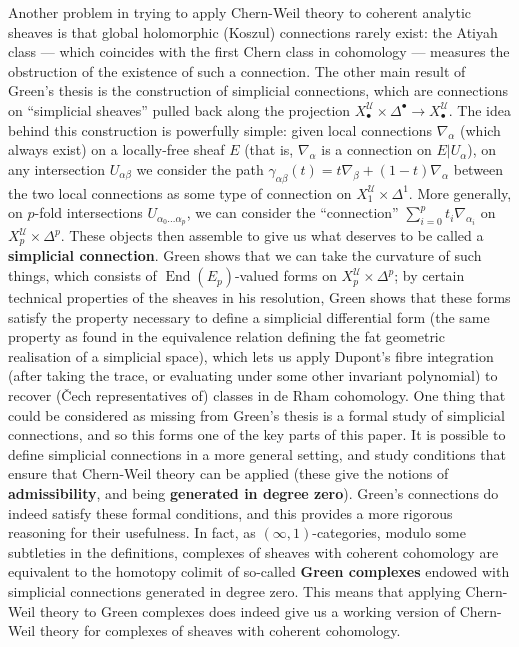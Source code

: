 \documentclass[11pt,fleqn]{article}
\theoremstyle{plain}
\theoremstyle{definition}
\theoremstyle{remark}
\numberwithin{equation}{theorem}
\newcommand{\cover}{\mathcal{U}}
\newcommand{\restricted}{\mathbin{\big\vert}}
\newcommand{\define}[1]{\textbf{#1}}
\newcommand{\nerve}[1]{X_{#1}^\cover}
\newcommand{\nervesimplex}[1]{\nerve{#1}\times\Delta^{#1}}
\DeclareMathOperator{\End}{End}
\begin{document}
    Another problem in trying to apply Chern-Weil theory to coherent analytic sheaves is that global holomorphic (Koszul) connections rarely exist: the Atiyah class --- which coincides with the first Chern class in cohomology --- measures the obstruction of the existence of such a connection.
    The other main result of Green's thesis is the construction of simplicial connections, which are connections on ``simplicial sheaves'' pulled back along the projection $\nervesimplex{\bullet}\to\nerve{\bullet}$.
    The idea behind this construction is powerfully simple: given local connections $\nabla_\alpha$ (which always exist) on a locally-free sheaf $E$ (that is, $\nabla_\alpha$ is a connection on $E\restricted U_\alpha$), on any intersection $U_{\alpha\beta}$ we consider the path $\gamma_{\alpha\beta}(t) = t\nabla_\beta + (1-t)\nabla_\alpha$ between the two local connections as some type of connection on $\nerve{1}\times\Delta^1$.
    More generally, on $p$-fold intersections $U_{\alpha_0\ldots\alpha_p}$, we can consider the ``connection'' $\sum_{i=0}^p t_i\nabla_{\alpha_i}$ on $\nerve{p}\times\Delta^p$.
    These objects then assemble to give us what deserves to be called a \define{simplicial connection}.
    Green shows that we can take the curvature of such things, which consists of $\End(E_p)$-valued forms on $\nerve{p}\times\Delta^p$; by certain technical properties of the sheaves in his resolution, Green shows that these forms satisfy the property necessary to define a simplicial differential form (the same property as found in the equivalence relation defining the fat geometric realisation of a simplicial space), which lets us apply Dupont's fibre integration (after taking the trace, or evaluating under some other invariant polynomial) to recover (Čech representatives of) classes in de Rham cohomology.
    One thing that could be considered as missing from Green's thesis is a formal study of simplicial connections, and so this forms one of the key parts of this paper.
    It is possible to define simplicial connections in a more general setting, and study conditions that ensure that Chern-Weil theory can be applied (these give the notions of \define{admissibility}, and being \define{generated in degree zero}).
    Green's connections do indeed satisfy these formal conditions, and this provides a more rigorous reasoning for their usefulness.
    In fact, as $(\infty,1)$-categories, modulo some subtleties in the definitions, complexes of sheaves with coherent cohomology are equivalent to the homotopy colimit of so-called \define{Gre{}en complexes} endowed with simplicial connections generated in degree zero.
    This means that applying Chern-Weil theory to Gre{}en complexes does indeed give us a working version of Chern-Weil theory for complexes of sheaves with coherent cohomology.
\end{document}
